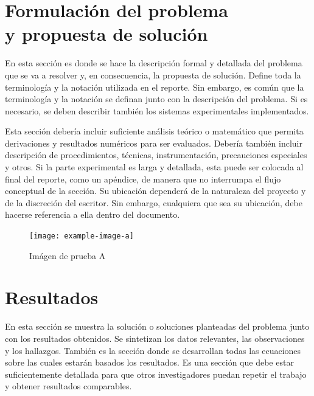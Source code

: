 \documentclass{article}
\begin{document}
\begin{multicols}{3}
\section*{Formulación del problema \\ y propuesta de solución}

\noindent En esta sección es donde se hace la descripción formal y detallada del problema que se va a resolver y, en consecuencia, la propuesta de solución. Define toda la terminología y la notación utilizada en el reporte. Sin embargo, es común que la terminología y la notación se definan junto con la descripción del problema. Si es necesario, se deben describir también los sistemas experimentales implementados.

Esta sección debería incluir suficiente análisis teórico o matemático que permita derivaciones y resultados numéricos para ser evaluados. Debería también incluir descripción de procedimientos, técnicas, instrumentación, precauciones especiales y otros. Si la parte experimental es larga y detallada, esta puede ser colocada al final del reporte, como un apéndice, de manera que no interrumpa el flujo conceptual de la sección. Su ubicación dependerá de la naturaleza del proyecto y de la discreción del escritor. Sin embargo, cualquiera que sea su ubicación, debe hacerse referencia a ella dentro del documento.

\begin{figure}[H]
    \vspace{5mm}
    \centering
    \texttt{[image: example-image-a]}
    \caption{Imágen de prueba A}
\end{figure}
\section*{Resultados}

\noindent En esta sección se muestra la solución o soluciones planteadas del problema junto con los resultados obtenidos. Se sintetizan los datos relevantes, las observaciones y los hallazgos. También es la sección donde se desarrollan todas las ecuaciones sobre las cuales estarán basados los resultados. Es una sección que debe estar suficientemente detallada para que otros investigadores puedan repetir el trabajo y obtener resultados comparables.


\end{multicols}
\end{document}
